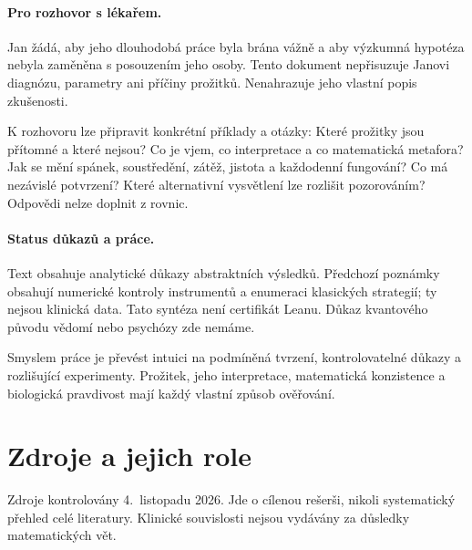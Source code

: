 \documentclass[11pt,a4paper]{article}
\begin{document}
\paragraph{Pro rozhovor s lékařem.}
Jan žádá, aby jeho dlouhodobá práce byla brána vážně a aby výzkumná hypotéza nebyla zaměněna s posouzením jeho osoby. Tento dokument nepřisuzuje Janovi diagnózu, parametry ani příčiny prožitků. Nenahrazuje jeho vlastní popis zkušenosti.

K rozhovoru lze připravit konkrétní příklady a otázky: Které prožitky jsou přítomné a které nejsou? Co je vjem, co interpretace a co matematická metafora? Jak se mění spánek, soustředění, zátěž, jistota a každodenní fungování? Co má nezávislé potvrzení? Které alternativní vysvětlení lze rozlišit pozorováním? Odpovědi nelze doplnit z rovnic.

\paragraph{Status důkazů a práce.}
Text obsahuje analytické důkazy abstraktních výsledků. Předchozí poznámky obsahují numerické kontroly instrumentů a enumeraci klasických strategií; ty nejsou klinická data. Tato syntéza není certifikát Leanu. Důkaz kvantového původu vědomí nebo psychózy zde nemáme.

Smyslem práce je převést intuici na podmíněná tvrzení, kontrolovatelné důkazy a rozlišující experimenty. Prožitek, jeho interpretace, matematická konzistence a biologická pravdivost mají každý vlastní způsob ověřování.

\newpage
\section*{Zdroje a jejich role}
Zdroje kontrolovány 4.~listopadu 2026. Jde o cílenou rešerši, nikoli systematický přehled celé literatury. Klinické souvislosti nejsou vydávány za důsledky matematických vět.
\end{document}

